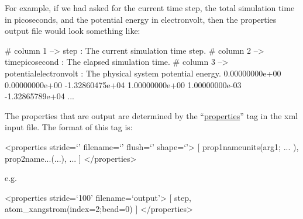 \documentclass[11pt,english,fleqn]{report}
\newenvironment{code}{%
\footnotesize
\verbatim
}{
\endverbatim
\normalsize
}
\begin{document}
For example, if we had asked for the current time step, the total
simulation time in picoseconds, and the potential energy in electronvolt,
then the properties output file would look something like:

\begin{code}
# column   1     --> step : The current simulation time step.
# column   2     --> time{picosecond} : The elapsed simulation time.
# column   3     --> potential{electronvolt} : The physical system potential energy.
    0.00000000e+00     0.00000000e+00    -1.32860475e+04
    1.00000000e+00     1.00000000e-03    -1.32865789e+04
...
\end{code}

The properties that are output are determined by the
{}``\hyperref[PROPERTIES]{properties}''
tag in the xml input file. The format of this tag is:

\begin{code}
<properties stride=`' filename=`' flush=`' shape=`'>
   [ prop1name{units}(arg1; ... ), prop2name{...}(...), ...  ]
</properties>
\end{code}

\noindent e.g.

\begin{code}
<properties stride=`100' filename=`output'>
   [ step, atom_x{angstrom}(index=2;bead=0) ]
</properties>
\end{code}
\end{document}
